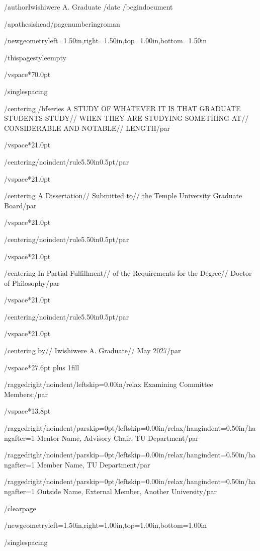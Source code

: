 /author{Iwishiwere A. Graduate}
/date{}
/begin{document}


/apathesishead/pagenumbering{roman}

/newgeometry{left=1.50in,right=1.50in,top=1.00in,bottom=1.50in}

/thispagestyle{empty}

/vspace*{70.0pt}

/singlespacing

{/centering
/bfseries A STUDY OF WHATEVER IT IS THAT GRADUATE STUDENTS STUDY//
WHEN THEY ARE STUDYING SOMETHING AT//
CONSIDERABLE AND NOTABLE//
LENGTH/par}

/vspace*{21.0pt}

{/centering/noindent/rule{5.50in}{0.5pt}/par}

/vspace*{21.0pt}

{/centering
A Dissertation//
Submitted to//
the Temple University Graduate Board/par}

/vspace*{21.0pt}

{/centering/noindent/rule{5.50in}{0.5pt}/par}

/vspace*{21.0pt}

{/centering
In Partial Fulfillment//
of the Requirements for the Degree//
Doctor of Philosophy/par}

/vspace*{21.0pt}

{/centering/noindent/rule{5.50in}{0.5pt}/par}

/vspace*{21.0pt}

{/centering
by//
Iwishiwere A. Graduate//
May 2027/par}

/vspace*{27.6pt plus 1fill}

{/raggedright/noindent/leftskip=0.00in/relax
Examining Committee Members:/par}

/vspace*{13.8pt}

{/raggedright/noindent/parskip=0pt/leftskip=0.00in/relax/hangindent=0.50in/hangafter=1
Mentor Name, Advisory Chair, TU Department/par}

{/raggedright/noindent/parskip=0pt/leftskip=0.00in/relax/hangindent=0.50in/hangafter=1
Member Name, TU Department/par}

{/raggedright/noindent/parskip=0pt/leftskip=0.00in/relax/hangindent=0.50in/hangafter=1
Outside Name, External Member, Another University/par}

/clearpage

/newgeometry{left=1.50in,right=1.00in,top=1.00in,bottom=1.00in}

/singlespacing

